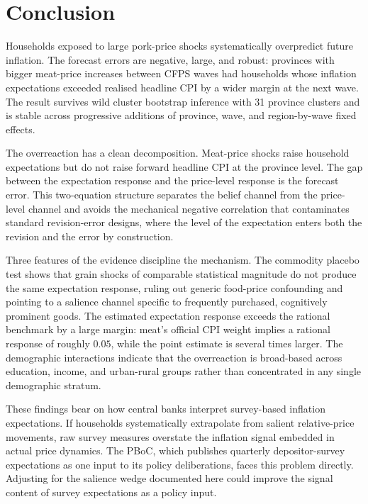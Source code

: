 \section{Conclusion}\label{sec:conclusion}

Households exposed to large pork-price shocks systematically
overpredict future inflation.
The forecast errors are negative, large, and robust: provinces
with bigger meat-price increases between CFPS waves had households
whose inflation expectations exceeded realised headline CPI by a
wider margin at the next wave.
The result survives wild cluster bootstrap inference with
31 province clusters and is stable across progressive additions
of province, wave, and region-by-wave fixed effects.

The overreaction has a clean decomposition.
Meat-price shocks raise household expectations but do not raise
forward headline CPI at the province level.
The gap between the expectation response and the price-level
response is the forecast error.
This two-equation structure separates the belief channel from the
price-level channel and avoids the mechanical negative correlation
that contaminates standard revision-error designs, where the level
of the expectation enters both the revision and the error by
construction.

Three features of the evidence discipline the mechanism.
The commodity placebo test shows that grain shocks of
comparable statistical magnitude do not produce the same
expectation response, ruling out generic food-price
confounding and pointing to a salience channel specific to
frequently purchased, cognitively prominent goods.
The estimated expectation response exceeds the rational
benchmark by a large margin: meat's official CPI weight implies
a rational response of roughly $0.05$, while the point estimate
is several times larger.
The demographic interactions indicate that the
overreaction is broad-based across education, income, and
urban-rural groups rather than concentrated in any single
demographic stratum.

These findings bear on how central banks interpret survey-based
inflation expectations.
If households systematically extrapolate from salient
relative-price movements, raw survey measures overstate the
inflation signal embedded in actual price dynamics.
The PBoC, which publishes quarterly depositor-survey expectations
as one input to its policy deliberations, faces this problem
directly.
Adjusting for the salience wedge documented here could improve
the signal content of survey expectations as a policy input.

